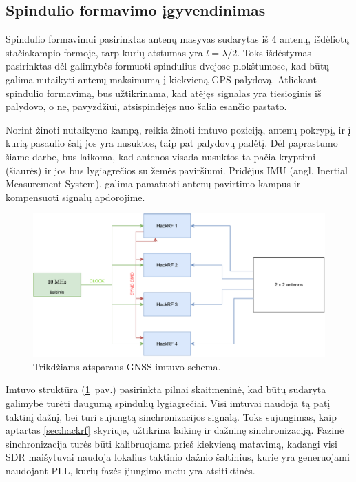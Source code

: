 \documentclass[main.tex]{subfiles}
\begin{document}
\subsection{Spindulio formavimo įgyvendinimas}\label{sec:beamforming_concept}

Spindulio formavimui pasirinktas antenų masyvas sudarytas iš 4 antenų, išdėliotų
sta\-čia\-kam\-pio formoje, tarp kurių atstumas yra $l=\lambda / 2$. Toks
išdėstymas pasirinktas dėl galimybės formuoti spindulius dvejose plokštumose,
kad būtų galima nutaikyti antenų maksimumą į kiekvieną GPS palydovą.
Atliekant spindulio formavimą, bus užtikrinama, kad atėjęs signalas yra
tiesioginis iš palydovo, o ne, pavyzdžiui, atsispindėjęs nuo šalia esančio pastato.

Norint žinoti nutaikymo kampą, reikia žinoti imtuvo poziciją, antenų pokrypį,
ir į kurią pasaulio šalį jos yra nusuktos, taip pat palydovų padėtį.
Dėl paprastumo šiame darbe,
bus laikoma, kad antenos visada nusuktos ta pačia kryptimi (šiaurės)
ir jos bus lygiagrečios su žemės paviršiumi. Pridėjus IMU (angl. Inertial Measurement
System), galima pamatuoti antenų pavirtimo kampus ir kompensuoti signalų apdorojime.

\begin{figure}[h]
    \begin{centering}
    \includegraphics[scale=0.8]{drawings/beamformer_diagram}
    \par\end{centering}
    \protect\caption{\label{fig:gnss_beamform_block}Trikdžiams atsparaus GNSS imtuvo schema.}
\end{figure}

Imtuvo struktūra (\ref{fig:gnss_beamform_block}~pav.) pasirinkta pilnai skaitmeninė,
kad būtų sudaryta galimybė turėti daugumą
spindulių lygiagrečiai. Visi imtuvai naudoja tą patį taktinį dažnį, bei turi sujungtą
sinchronizacijos signalą. Toks sujungimas, kaip aptartas \ref{sec:hackrf} skyriuje,
užtikrina laikinę ir dažninę sinchronizaciją. Fazinė sinchronizacija turės būti
kalibruojama prieš kiekvieną matavimą, kadangi visi SDR maišytuvai naudoja lokalius
taktinio dažnio šaltinius, kurie yra generuojami naudojant PLL, kurių fazės
įjungimo metu yra atsitiktinės.
\end{document}
